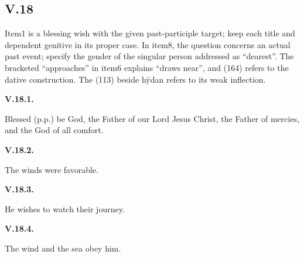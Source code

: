 \subsection*{V.18}

Item1 is a blessing wish with the given past-participle target; keep each title and dependent genitive in its proper case. In item8, the question concerns an actual past event; specify the gender of the singular person addressed as “dearest”. The bracketed “approaches” in item6 explains “draws near”, and (164) refers to the dative construction. The (113) beside hȳdan refers to its weak inflection.

\par\begin{minipage}{\linewidth}\raggedright
\textbf{V.18.1.}

Blessed (p.p.) be God, the Father of our Lord Jesus Christ, the Father of mercies, and the God of all comfort.

\end{minipage}\par\addvspace{4pt}

\par\begin{minipage}{\linewidth}\raggedright
\textbf{V.18.2.}

The winds were favorable.

\end{minipage}\par\addvspace{4pt}

\par\begin{minipage}{\linewidth}\raggedright
\textbf{V.18.3.}

He wishes to watch their journey.

\end{minipage}\par\addvspace{4pt}

\par\begin{minipage}{\linewidth}\raggedright
\textbf{V.18.4.}

The wind and the sea obey him.

\end{minipage}\par\addvspace{4pt}

